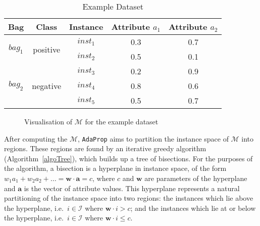 \documentclass[a4paper,12pt]{article} %
\newcommand{\AdaProp}{\texttt{AdaProp}\xspace}
\newcommand{\mcl}[1]{\mathcal{#1}}
\newcommand{\vect}[1]{\boldsymbol{#1}}
\begin{document}
\begin{table}
\begin{center}
\begin{tabular}{ccccc}
    \toprule
    Bag & Class & Instance & Attribute $a_1$ & Attribute $a_2$ \\
    \midrule
    \multirow{2}{*}{$bag_1$} & \multirow{2}{*}{positive} & $inst_1$ & 0.3 & 0.7 \\
    &  & $inst_2$ & 0.5 & 0.1 \\
    \cmidrule(r){1-5}
    \multirow{3}{*}{$bag_2$} & \multirow{3}{*}{negative} & $inst_3$ & 0.2 & 0.9 \\
    & & $inst_4$ & 0.8 & 0.6 \\
    & & $inst_5$ & 0.5 & 0.7 \\
    \bottomrule
    
\end{tabular}
\end{center}
%
\caption{Example Dataset}
\label{tEgData}
\end{table}

\begin{figure}
\begin{center}
\end{center}
\caption{Visualisation of $\mcl{M}$ for the example dataset}
\label{visM}
\end{figure}

After computing the $\mcl{M}$, 
    \AdaProp aims to partition the instance space of $\mcl{M}$ into regions.
These regions are found by an iterative greedy algorithm (Algorithm~\ref{algoTree}), 
    which builds up a tree of bisections.
For the purposes of the algorithm, 
    a bisection is a hyperplane in instance space, 
    of the form $w_1a_1 + w_2a_2 + \ldots = \vect{w} \cdot \vect{a} = c$,
    where $c$ and $\vect{w}$ are parameters of the hyperplane and 
    $\vect{a}$ is the vector of attribute values.
This hyperplane represents a natural partitioning of the instance space
    into two regions:
        the instances which lie above the hyperplane, 
            i.e.\ $i \in \mcl{I}$ where $\vect{w} \cdot{i} > c$; and
        the instances which lie at or below the hyperplane,
            i.e.\ $i \in \mcl{I}$ where $\vect{w} \cdot{i} \leq c$.
    
\end{document}
